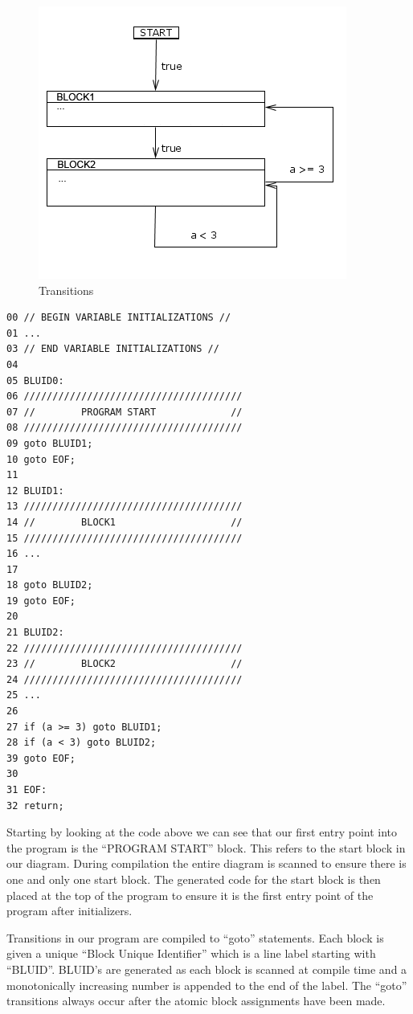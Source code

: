 \begin{figure}[h]
	\centering
	\includegraphics[width=\imgmedphoto]{./images/correctness_ex_transition.png}
	\caption{Transitions}
	\label{fig:correctness_ex_transition}
\end{figure}

\begin{lstlisting}[frame=single]
00 // BEGIN VARIABLE INITIALIZATIONS //
01 ...
03 // END VARIABLE INITIALIZATIONS //
04
05 BLUID0:
06 //////////////////////////////////////
07 //        PROGRAM START             //
08 //////////////////////////////////////
09 goto BLUID1;
10 goto EOF;
11
12 BLUID1:
13 //////////////////////////////////////
14 //        BLOCK1                    //
15 //////////////////////////////////////
16 ...
17 
18 goto BLUID2;
19 goto EOF;
20
21 BLUID2:
22 //////////////////////////////////////
23 //        BLOCK2                    //
24 //////////////////////////////////////
25 ...
26
27 if (a >= 3) goto BLUID1;
28 if (a < 3) goto BLUID2;
39 goto EOF;
30
31 EOF:
32 return;
\end{lstlisting}

Starting by looking at the code above we can see that our first entry point into the program is the ``PROGRAM START'' block. This refers to the start block in our diagram. During compilation the entire diagram is scanned to ensure there is one and only one start block. The generated code for the start block is then placed at the top of the program to ensure it is the first entry point of the program after initializers. 

Transitions in our program are compiled to ``goto'' statements. Each block is given a unique ``Block Unique Identifier'' which is a line label starting with ``BLUID''. BLUID's are generated as each block is scanned at compile time and a monotonically increasing number is appended to the end of the label. The ``goto'' transitions always occur after the atomic block assignments have been made.

